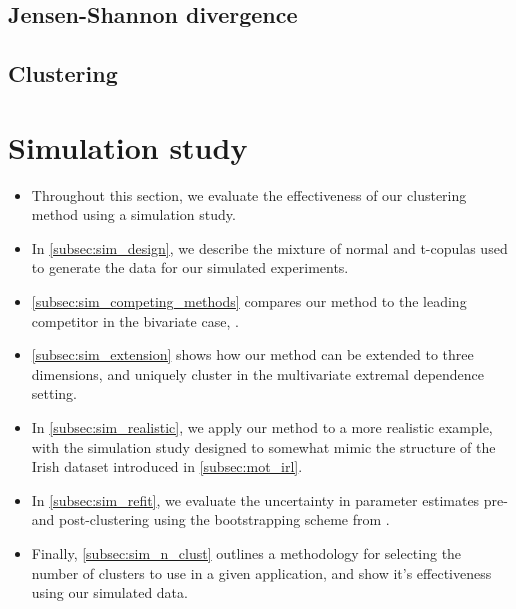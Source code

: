 \documentclass{article}
\numberwithin{equation}{section}
\begin{document}
\subsection{Jensen-Shannon divergence}
\subsection{Clustering}

\section{Simulation study}\label{sec:sim}

\begin{itemize}
  \item Throughout this section, we evaluate the effectiveness of our clustering method using a simulation study.
  \item In \ref{subsec:sim_design}, we describe the mixture of normal and t-copulas used to generate the data for our simulated experiments. 
  \item \ref{subsec:sim_competing_methods} compares our method to the leading competitor in the bivariate case, \cite{Vignotto2021}.
  \item \ref{subsec:sim_extension} shows how our method can be extended to three dimensions, and uniquely cluster in the multivariate extremal dependence setting.
  \item In \ref{subsec:sim_realistic}, we apply our method to a more realistic example, with the simulation study designed to somewhat mimic the structure of the Irish dataset introduced in \ref{subsec:mot_irl}.
  \item In \ref{subsec:sim_refit}, we evaluate the uncertainty in parameter estimates pre- and post-clustering using the bootstrapping scheme from \cite{Heffernan2004}.
  \item Finally, \ref{subsec:sim_n_clust} outlines a methodology for selecting the number of clusters to use in a given application, and show it's effectiveness using our simulated data. 
\end{itemize}
\end{document}
